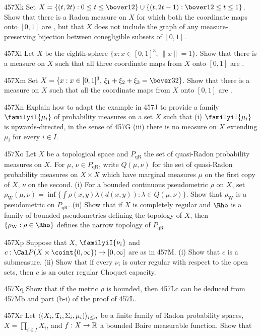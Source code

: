 {\spheader 457Xk Set
$X=\{(t,2t):0\le t\le\bover12\}\cup\{(t,2t-1):\bover12\le t\le 1\}$.
Show that there is a Radon measure on $X$ for which both the coordinate
maps onto $[0,1]$ are \imp, but that $X$ does not include the graph of
any measure-preserving bijection between conegligible subsets of
$[0,1]$.

\spheader 457Xl Let $X$ be the eighth-sphere
$\{x:x\in[0,1]^3,\,\|x\|=1\}$.   Show that there is a measure on $X$
such that all three coordinate maps from $X$ onto $[0,1]$ are \imp.

\spheader 457Xm Set $X=\{x:x\in[0,1]^3,\,\xi_1+\xi_2+\xi_3=\bover32\}$.
Show that there is a measure on $X$ such that all the coordinate maps
from $X$ onto $[0,1]$ are \imp.   

\spheader 457Xn Explain how to adapt the example in 457J to provide a
family $\familyiI{\mu_i}$ of probability measures on a set $X$ such that
(i) $\familyiI{\mu_i}$ is upwards-directed, in the sense of 457G
(iii) there is no measure on
$X$ extending $\mu_i$ for every $i\in I$.

\spheader 457Xo Let $X$ be a topological space and
$P_{\text{qR}}$ the set of quasi-Radon probability measures on $X$.
For $\mu$,
$\nu\in P_{\text{qR}}$, write $Q(\mu,\nu)$ for the set of quasi-Radon
probability measures on $X\times X$ which have marginal measures
$\mu$ on the first copy of $X$, $\nu$ on the second.   (i) For
a bounded continuous pseudometric $\rho$ on $X$, set
$\rho_{\text{W}}(\mu,\nu)
=\inf\{\int\rho(x,y)\lambda(d(x,y)):\lambda\in Q(\mu,\nu)\}$.   Show that
$\rho_{\text{W}}$ is a pseudometric on $P_{\text{qR}}$.
(ii) Show that if $X$ is completely regular and $\Rho$ is a family of
bounded pseudometrics defining
the topology of $X$, then $\{\rho_{\text{W}}:\rho\in\Rho\}$ defines the
narrow topology of $P_{\text{qR}}$.

\spheader 457Xp Suppose that $X$, $\familyiI{\nu_i}$ and
$c:\Cal P(X\times\coint{0,\infty})\to[0,\infty]$ are as in 457M.
(i) Show that $c$ is a
submeasure.   (ii) Show that if every $\nu_i$ is outer
regular with respect to the open sets, then $c$ is an outer regular Choquet
capacity.

\spheader 457Xq Show that if the metric $\rho$ is bounded,
then 457Lc can be deduced from 457Mb and part (b-i) of the proof of 457L.

\spheader 457Xr Let
$\langle(X_i,\frak T_i,\Sigma_i,\mu_i)\rangle_{i\le n}$ be a finite
family of Radon probability spaces,
$X=\prod_{i\in I}X_i$, and $f:X\to\Bbb R$ a bounded Baire measurable
function.   Show that

}
